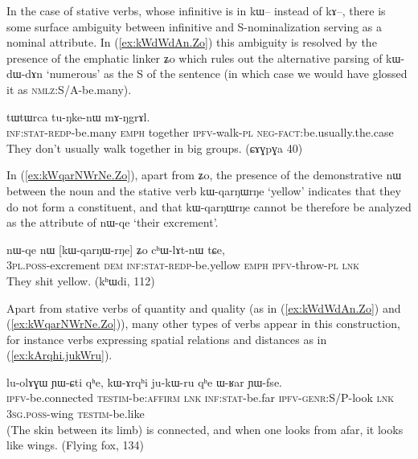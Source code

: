 \documentclass[oldfontcommands,oneside,a4paper,11pt]{article}
\newcommand{\ipa}[1]{{\phon \mbox{#1}}} %
\newcommand{\refb}[1]{(\ref{#1})}
\begin{document}
  In the case of stative verbs, whose infinitive is in \ipa{kɯ--} instead of \ipa{kɤ--}, there is some surface ambiguity between infinitive and S-nominalization serving as a nominal attribute. In \refb{ex:kWdWdAn.Zo}  this ambiguity is resolved by the presence of the emphatic linker \ipa{ʑo} which rules out the alternative parsing of \ipa{kɯ-dɯ-dɤn} `numerous' as the S of the sentence (in which case we would have glossed it as \textsc{nmlz}:S/A-be.many).
  
\begin{exe}
\ex \label{ex:kWdWdAn.Zo}
\gll
[\ipa{kɯ-dɯ-dɤn}] 	\ipa{ʑo} 	\ipa{tɯtɯrca} 	\ipa{tu-ŋke-nɯ} 	\ipa{mɤ-ŋgrɤl.} \\
\textsc{inf:stat-redp}-be.many \textsc{emph} together \textsc{ipfv}-walk-\textsc{pl} \textsc{neg-fact}:be.usually.the.case \\
\glt They don't usually walk together in big groups. (ɕɤɣpɣa 40)
\end{exe}

In \refb{ex:kWqarNWrNe.Zo}, apart from \ipa{ʑo}, the presence of the demonstrative   \ipa{nɯ} between the noun  and the stative verb 	\ipa{kɯ-qarŋɯrŋe} `yellow' indicates that  they do not form a constituent, and that 	\ipa{kɯ-qarŋɯrŋe} cannot be therefore be analyzed as the attribute of  \ipa{nɯ-qe} `their excrement'.

\begin{exe}
\ex \label{ex:kWqarNWrNe.Zo}
\gll
\ipa{nɯ-qe} 	\ipa{nɯ} 	[\ipa{kɯ-qarŋɯ-rŋe}] 	\ipa{ʑo} 	\ipa{cʰɯ-lɤt-nɯ} 	\ipa{tɕe,} \\
\textsc{3pl.poss}-excrement \textsc{dem} \textsc{inf:stat-redp}-be.yellow \textsc{emph}  \textsc{ipfv}-throw-\textsc{pl} \textsc{lnk} \\
\glt They shit yellow. (kʰɯdi, 112)
\end{exe}


Apart from stative  verbs of quantity and quality   (as in \refb{ex:kWdWdAn.Zo} and \refb{ex:kWqarNWrNe.Zo}), many other types of verbs appear in this construction, for instance verbs expressing spatial relations and distances as in \refb{ex:kArqhi.jukWru}.

\begin{exe}
\ex \label{ex:kArqhi.jukWru}
\gll
\ipa{lu-olɤɣɯ} 	\ipa{ɲɯ-ɕti} 	\ipa{qʰe,} 	\ipa{kɯ-ɤrqʰi} 	\ipa{ju-kɯ-ru} 	\ipa{qʰe} 	\ipa{ɯ-ʁar} 	\ipa{ɲɯ-fse.}\\
\textsc{ipfv}-be.connected \textsc{testim}-be:\textsc{affirm} \textsc{lnk} \textsc{inf:stat}-be.far \textsc{ipfv-genr}:S/P-look \textsc{lnk} \textsc{3sg.poss}-wing \textsc{testim}-be.like\\
\glt (The skin between its limb) is connected, and when one looks from afar, it looks like wings. (Flying fox, 134)
\end{exe}
\end{document}

